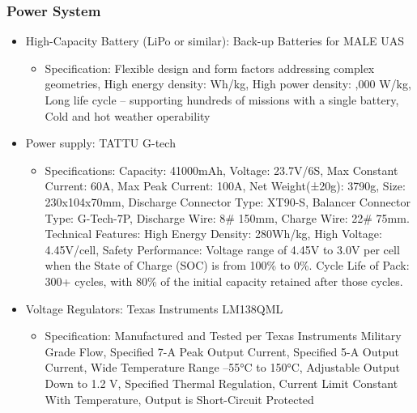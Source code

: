 \subsubsection{Power System}
\begin{itemize}
    \item High-Capacity Battery (LiPo or similar): Back-up Batteries for MALE UAS
    \begin{itemize}
        \item Specification: Flexible design and form factors addressing complex geometries, High energy density:  Wh/kg, High power density: ,000 W/kg, Long life cycle – supporting hundreds of missions with a single battery, Cold and hot weather operability
    \end{itemize}
    \item Power supply: TATTU G-tech
    \begin{itemize}
        \item Specifications: Capacity: 41000mAh, Voltage: 23.7V/6S, Max Constant Current: 60A, Max Peak Current: 100A, Net Weight(±20g): 3790g, Size: 230x104x70mm, Discharge Connector Type: XT90-S, Balancer Connector Type: G-Tech-7P, Discharge Wire: 8\# 150mm, Charge Wire: 22\# 75mm. Technical Features: High Energy Density: 280Wh/kg, High Voltage: 4.45V/cell, Safety Performance: Voltage range of 4.45V to 3.0V per cell when the State of Charge (SOC) is from 100\% to 0\%. Cycle Life of Pack: 300+ cycles, with 80\% of the initial capacity retained after those cycles.
    \end{itemize}
    \item Voltage Regulators: Texas Instruments LM138QML
    \begin{itemize}
        \item Specification: Manufactured and Tested per Texas Instruments Military Grade Flow, Specified 7-A Peak Output Current, Specified 5-A Output Current, Wide Temperature Range –55°C to 150°C, Adjustable Output Down to 1.2 V, Specified Thermal Regulation, Current Limit Constant With Temperature, Output is Short-Circuit Protected
    \end{itemize}
\end{itemize}

